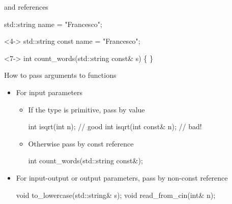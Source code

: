 \begin{frame}[fragile]{ and references}

  \begin{codeblock}
std::string name = "Francesco";
\end{codeblock}

  \begin{codeblock}<4->{
std::string \alert{const} name = "Francesco";
}\end{codeblock}

  \begin{codeblock}<7->{
int count\_words(std::string \alert{const\&} s)
\{
   \ddd
\}}\end{codeblock}
\end{frame}

\begin{frame}[fragile]{How to pass arguments to functions}
  \begin{itemize}
  \item For input parameters
    \begin{itemize}
    \item If the type is primitive, pass by value
      \begin{codeblock}
int isqrt(int n);        // good
int isqrt(int const& n); // bad!\end{codeblock}
    \item Otherwise pass by const reference
      \begin{codeblock}
int count\_words(std::string const\&);\end{codeblock}
    \end{itemize}
  \item For input-output or output parameters, pass by non-const reference
    \begin{codeblock}
void to_lowercase(std::string\& s);
void read_from_cin(int& n);\end{codeblock}
  \end{itemize}
\end{frame}

